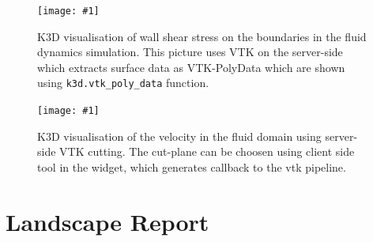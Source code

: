 \documentclass{deliverablereport}
\newcommand{\screenshot}[2]{
\begin{figure}[ht]
  \texttt{[image: \#1]}
  \caption{#2}
  \label{#1}
\end{figure}}
\begin{document}
\screenshot{k3d_cfd4.png}{K3D visualisation of wall shear stress on
  the boundaries in the fluid dynamics simulation. This picture uses
  VTK on the server-side which extracts surface data as VTK-PolyData
  which are shown using \texttt{k3d.vtk\_poly\_data} function. }

\screenshot{k3d_cfd5.png}{K3D visualisation of the velocity in the
  fluid domain using server-side VTK cutting. The cut-plane can be
  choosen using client side tool in the widget, which generates
  callback to the vtk pipeline. }


\clearpage
\section{Landscape Report}\label{landscape}

\end{document}
